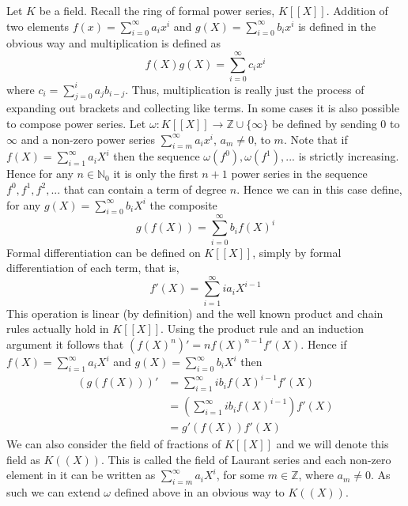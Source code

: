 \documentclass{article}
\newcommand{\mbb}[1]{\mathbb{#1}}
\numberwithin{equation}{section}
\begin{document}
Let $K$ be a field. Recall the ring of formal power series, $K[[X]]$. Addition of two elements $f(x) = \sum_{i = 0}^\infty a_ix^i$ and $g(X) = \sum_{i = 0}^\infty b_ix^i$ is defined in the obvious way and multiplication is defined as
$$f(X)g(X) = \sum_{i = 0}^{\infty}c_i x^i$$
where $c_i = \sum_{j = 0}^i a_j b_{i-j}$. Thus, multiplication is really just the process of expanding out brackets and collecting like terms. In some cases it is also possible to compose power series. Let $\omega : K[[X]] \to \mbb Z \cup \{\infty \}$ be defined by sending $0$ to $\infty$ and a non-zero power series $\sum_{i = m}^\infty a_i x^i$, $a_m \neq 0$, to $m$. Note that if $f(X) = \sum_{i = 1}^\infty a_iX^i$ then the sequence $\omega(f^0), \omega(f^1), ...$ is strictly increasing. Hence for any $n \in \mbb N_0$ it is only the first $n+1$ power series in the sequence $f^0, f^1, f^2, ...$ that can contain a term of degree $n$.  
Hence we can in this case define, for any $g(X) = \sum_{i = 0}^\infty b_i X^i$ the composite
$$g(f(X)) = \sum_{i = 0}^\infty b_i f(X)^i$$
Formal differentiation can be defined on $K[[X]]$, simply by formal differentiation of each term, that is,
$$f'(X) = \sum_{i = 1}^\infty i a_{i} X^{i-1}$$
This operation is linear (by definition) and the well known product and chain rules actually hold in $K[[X]]$. Using the product rule and an induction argument it follows that $(f(X)^n)' = n f(X)^{n-1}f'(X)$. Hence if $f(X) = \sum_{i = 1}^\infty a_i X^i$ and $g(X) = \sum_{i = 0}^\infty b_i X^i$ then
\begin{align*}
    (g(f(X)))' &= \sum_{i = 1}^\infty ib_i f(X)^{i-1}f'(X)\\
    &= (\sum_{i = 1}^\infty i b_i f(X)^{i-1})f'(X) \\
    &= g'(f(X))f'(X)
\end{align*}
We can also consider the field of fractions of $K[[X]]$ and we will denote this field as $K((X))$. This is called the field of Laurant series and each non-zero element in it can be written as $\sum_{i = m}^\infty a_i X^i$, for some $m \in \mbb Z$, where $a_m \neq 0$. As such we can extend $\omega$ defined above in an obvious way to $K((X))$.
\end{document}
